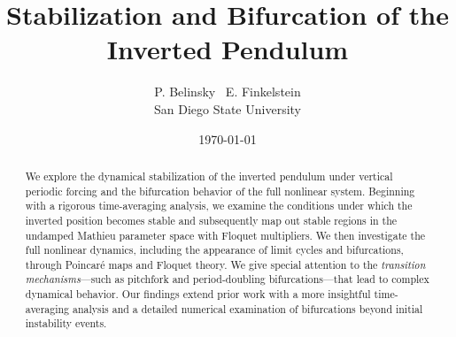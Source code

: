 \documentclass[12pt, letterpaper]{article}
\title{Stabilization and Bifurcation of the Inverted Pendulum}  %
\author{P. Belinsky ~E. Finkelstein  \\        %
\small San Diego State University}
\date{\today}
\begin{document}
\raggedright
\vspace{2cm}
\maketitle
\vspace{2cm}
\begin{abstract}
We explore the dynamical stabilization of the inverted pendulum under vertical periodic forcing and the bifurcation behavior of the full nonlinear system. Beginning with a rigorous time-averaging analysis, we examine the conditions under which the inverted position becomes stable and subsequently map out stable regions in the undamped Mathieu parameter space with Floquet multipliers. We then investigate the full nonlinear dynamics, including the appearance of limit cycles and bifurcations, through Poincaré maps and Floquet theory. We give special attention to the \emph{transition mechanisms}—such as pitchfork and period-doubling bifurcations—that lead to complex dynamical behavior. Our findings extend prior work with a more insightful time-averaging analysis and a detailed numerical examination of bifurcations beyond initial instability events.
\end{abstract}

\newpage
\begingroup
\setlength{\cftbeforesecskip}{0pt}  %
\setlength{\cftsecindent}{0pt}      %
\renewcommand{\baselinestretch}{1}  %
\tableofcontents
\thispagestyle{fancy}  %
\endgroup
\listoffigures
\newpage  %
\end{document}
